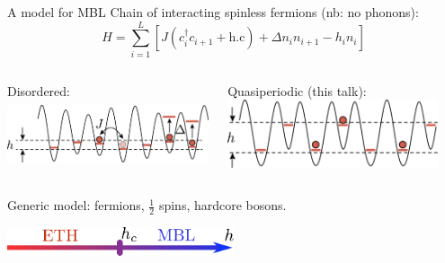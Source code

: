 \begin{frame}{A model for MBL}
Chain of interacting spinless fermions (nb: no phonons):
\[
	H = \sum_{i=1}^L \left[ J (c_i^\dagger c_{i+1} + \text{h.c}) + \Delta n_i n_{i+1} - h_i n_i \right]
\]

\begin{columns}
\begin{column}{0.5\textwidth}
Disordered:
\centering
\includegraphics[height=2cm]{img/2_MBL/XXZ_cold_atoms}
\end{column}
%
\begin{column}{0.5\textwidth}
Quasiperiodic (this talk):
\centering
\includegraphics[height=2cm]{img/2_MBL/XXZ_QP_cold_atoms}
\end{column}
\end{columns}
Generic model: fermions, $\frac{1}{2}$ spins, hardcore bosons.

{
\centering
\includegraphics[width=0.5\textwidth]{img/2_MBL/arrow}

}
\end{frame}


